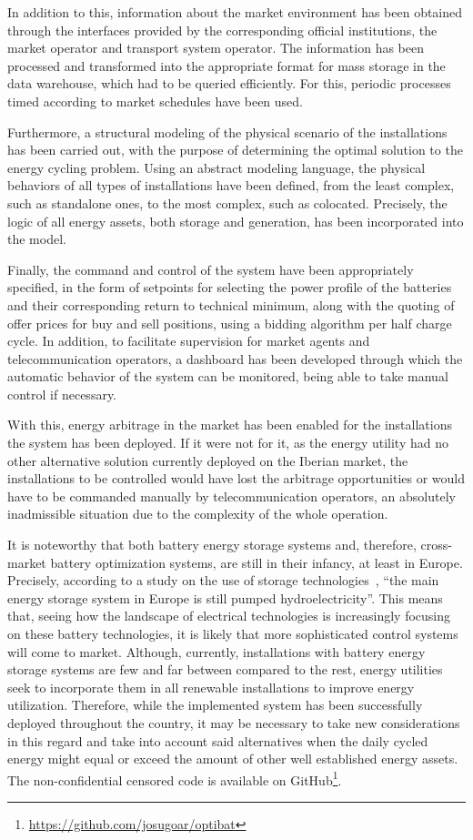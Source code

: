 In addition to this, information about the market environment has been obtained through the interfaces provided by the corresponding official institutions, the market operator and transport system operator. The information has been processed and transformed into the appropriate format for mass storage in the data warehouse, which had to be queried efficiently. For this, periodic processes timed according to market schedules have been used.

Furthermore, a structural modeling of the physical scenario of the installations has been carried out, with the purpose of determining the optimal solution to the energy cycling problem. Using an abstract modeling language, the physical behaviors of all types of installations have been defined, from the least complex, such as standalone ones, to the most complex, such as colocated. Precisely, the logic of all energy assets, both storage and generation, has been incorporated into the model.

Finally, the command and control of the system have been appropriately specified, in the form of setpoints for selecting the power profile of the batteries and their corresponding return to technical minimum, along with the quoting of offer prices for buy and sell positions, using a bidding algorithm per half charge cycle. In addition, to facilitate supervision for market agents and telecommunication operators, a dashboard has been developed through which the automatic behavior of the system can be monitored, being able to take manual control if necessary.

With this, energy arbitrage in the market has been enabled for the installations the system has been deployed. If it were not for it, as the energy utility had no other alternative solution currently deployed on the Iberian market, the installations to be controlled would have lost the arbitrage opportunities or would have to be commanded manually by telecommunication operators, an absolutely inadmissible situation due to the complexity of the whole operation.

It is noteworthy that both battery energy storage systems and, therefore, cross-market battery optimization systems, are still in their infancy, at least in Europe. Precisely, according to a study on the use of storage technologies~\cite{hu2022potential}, ``the main energy storage system in Europe is still pumped hydroelectricity''. This means that, seeing how the landscape of electrical technologies is increasingly focusing on these battery technologies, it is likely that more sophisticated control systems will come to market. Although, currently, installations with battery energy storage systems are few and far between compared to the rest, energy utilities seek to incorporate them in all renewable installations to improve energy utilization. Therefore, while the implemented system has been successfully deployed throughout the country, it may be necessary to take new considerations in this regard and take into account said alternatives when the daily cycled energy might equal or exceed the amount of other well established energy assets. The non-confidential censored code is available on GitHub\footnote{\url{https://github.com/josugoar/optibat}}.

